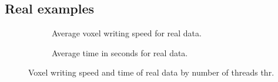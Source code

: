 \documentclass{article}
\begin{document}
\subsection{Real examples}\label{subsec:realexamples}

\begin{figure}[!ht]
  \begin{subfigure}[t]{0.5\linewidth}
  \vskip 0pt
    \caption{Average voxel writing speed for real data.}\label{fig:speedreal}
  \end{subfigure}
  \begin{subfigure}[t]{0.5\textwidth}
  \vskip 0pt
    \caption{Average time in seconds for real data.}\label{fig:timereal}
  \end{subfigure}
\caption{Voxel writing speed and time of real data by number of threads thr.}\label{fig:real}
\end{figure}
\end{document}

